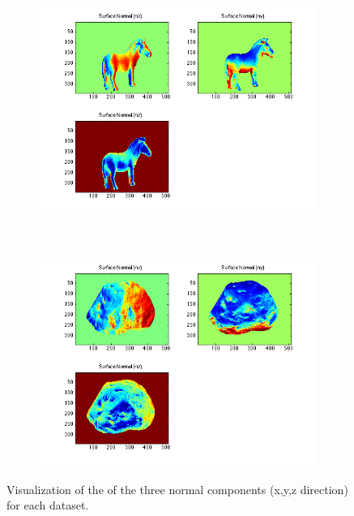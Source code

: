 \documentclass{paper}
\begin{document}
\begin{figure}[h!]
    \begin{subfigure}{0.45\textwidth}
        \includegraphics[width=\textwidth]{results/horse/horse_n_xyz}
    \end{subfigure}
    ~
    \begin{subfigure}{0.45\textwidth}
        \includegraphics[width=\textwidth]{results/rock/rock_n_xyz}
    \end{subfigure}
    
    \caption{Visualization of the of the three normal components (x,y,z direction) for each dataset.} 
    \label{fig:normals_xyz}       
\end{figure}
\end{document}

